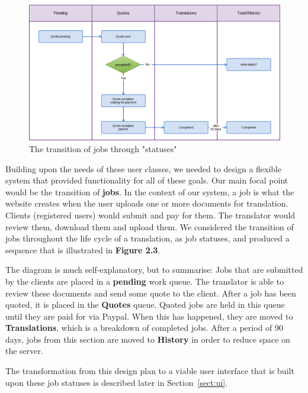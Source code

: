 \documentclass{l3proj}
\begin{document}
\begin{figure}[h]
\centering
\includegraphics[width=\linewidth]{jobstatuses}
\caption{The transition of jobs through "statuses"}
\end{figure}

Building upon the needs of these user classes, we needed to design a flexible system that provided functionality for all of these goals. Our main focal point would be the transition of \textbf{jobs}. In the context of our system, a job is what the website creates when the user uploads one or more documents for translation. Clients (registered users) would submit and pay for them. The translator would review them, download them and upload them. We considered the transition of jobs throughout the life cycle of a translation, as job statuses, and produced a sequence that is illustrated in \textbf{Figure 2.3}. \newline

The diagram is much self-explanatory, but to summarise: Jobs that are submitted by the clients are placed in a \textbf{pending} work queue. The translator is able to review these documents and send some quote to the client. After a job has been quoted, it is placed in the \textbf{Quotes} queue. Quoted jobs are held in this queue until they are paid for via Paypal. When this has happened, they are moved to \textbf{Translations}, which is a breakdown of completed jobs. After a period of 90 days, jobs from this section are moved to \textbf{History} in order to reduce space on the server.

The transformation from this design plan to a viable user interface that is built upon these job statuses is described later in Section~\ref{sect:ui}.
\newline
\end{document}

